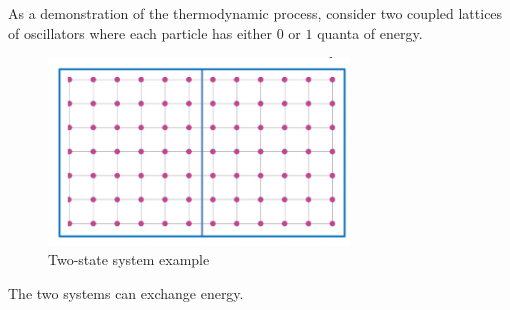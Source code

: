 As a demonstration of the thermodynamic process, consider two coupled lattices of oscillators where each particle has either $0$ or $1$ quanta of energy.

\begin{figure}[H]
	\centering
	\includegraphics[width=80mm]{6.png}
	\caption{Two-state system example}
\end{figure}

The two systems can exchange energy.

